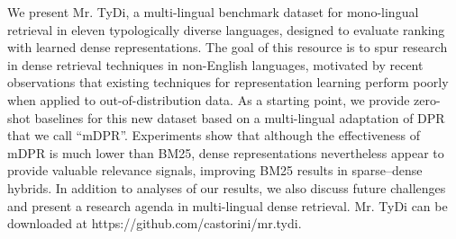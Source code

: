 We present Mr. TyDi, a multi-lingual benchmark dataset for mono-lingual retrieval in eleven typologically diverse languages, designed to evaluate ranking with learned dense representations. The goal of this resource is to spur research in dense retrieval techniques in non-English languages, motivated by recent observations that existing techniques for representation learning perform poorly when applied to out-of-distribution data. As a starting point, we provide zero-shot baselines for this new dataset based on a multi-lingual adaptation of DPR that we call ``mDPR''. Experiments show that although the effectiveness of mDPR is much lower than BM25, dense representations nevertheless appear to provide valuable relevance signals, improving BM25 results in sparse--dense hybrids. In addition to analyses of our results, we also discuss future challenges and present a research agenda in multi-lingual dense retrieval. Mr. TyDi can be downloaded at https://github.com/castorini/mr.tydi.
